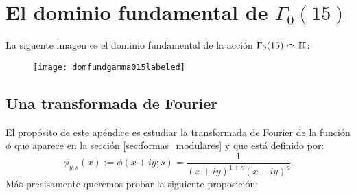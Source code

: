 \documentclass[../../tesis_maestria]{subfiles}
\begin{document}
\chapter{El dominio fundamental de $\Gamma_0(15)$}
La siguente imagen es el dominio fundamental de la acci\'on $\Gamma_0(15)\curvearrowright\mathbb{H}$:

\begin{figure}[!h]%
  \centering
  \texttt{[image: domfundgamma015labeled]}
\end{figure}%


\section{Una transformada de Fourier}

El prop\'osito de este ap\'endice es estudiar la transformada de Fourier de la funci\'on $\phi$
que aparece en la secci\'on \ref{sec:formas_modulares} y que est\'a definido por:
\[
  \phi_{y,s}(x):=\phi(x+iy;s)=\frac{1}{(x+iy)^{1+s}(x-iy)^s}.
\]
M\'as precisamente queremos probar la siguiente proposici\'on:
\end{document}
